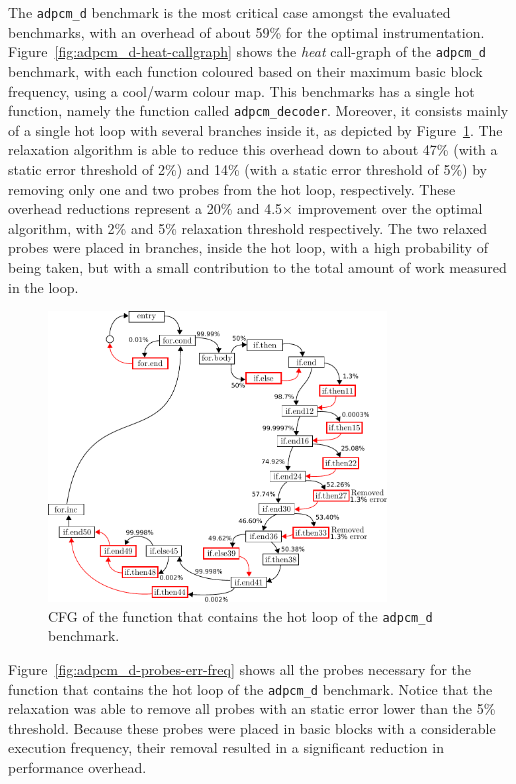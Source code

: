 The \texttt{adpcm\_d} benchmark is the most critical case amongst the evaluated benchmarks, with an overhead of about 59\% for the optimal instrumentation.
Figure~\ref{fig:adpcm_d-heat-callgraph} shows the \textit{heat} call-graph of the \texttt{adpcm\_d} benchmark, with each function coloured based on their maximum basic block frequency, using a cool/warm colour map.
This benchmarks has a single hot function, namely the function called \verb|adpcm_decoder|.
Moreover, it consists mainly of a single hot loop with several branches inside it, as depicted by Figure~\ref{fig:adpcm_d-cfg-instr}.
The relaxation algorithm is able to reduce this overhead down to about 47\% (with a static error threshold of 2\%) and 14\% (with a static error threshold of 5\%) by removing only one and two probes from the hot loop, respectively.
These overhead reductions represent a 20\% and 4.5$\times$ improvement over the optimal algorithm, with 2\% and 5\% relaxation threshold respectively.
The two relaxed probes were placed in branches, inside the hot loop, with a high probability of being taken, but with a small contribution to the total amount of work measured in the loop.

\begin{figure}[htb]
    \centering
    \includegraphics[width=0.8\textwidth]{figs/adpcm_d-cfg-instr.pdf}
    \caption{CFG of the function that contains the hot loop of the \texttt{adpcm\_d} benchmark.}
    \label{fig:adpcm_d-cfg-instr}
\end{figure}

Figure~\ref{fig:adpcm_d-probes-err-freq} shows all the probes necessary for the function that contains the hot loop of the \texttt{adpcm\_d} benchmark.
Notice that the relaxation was able to remove all probes with an static error lower than the 5\% threshold.
Because these probes were placed in basic blocks with a considerable execution frequency, their removal resulted in a significant reduction in performance overhead.

